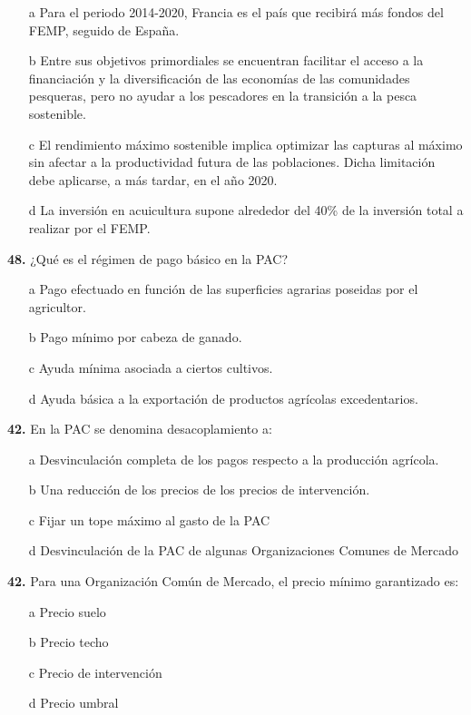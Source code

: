 \documentclass{nuevotema}
\begin{document}
\begin{enumerate}
    \item[a] Para el periodo 2014-2020, Francia es el país que recibirá más fondos del FEMP, seguido de España.
    \item[b] Entre sus objetivos primordiales se encuentran facilitar el acceso a la financiación y la diversificación de las economías de las comunidades pesqueras, pero no ayudar a los pescadores en la transición a la pesca sostenible.
    \item[c] El rendimiento máximo sostenible implica optimizar las capturas al máximo sin afectar a la productividad futura de las poblaciones. Dicha limitación debe aplicarse, a más tardar, en el año 2020.
    \item[d] La inversión en acuicultura supone alrededor del 40\% de la inversión total a realizar por el FEMP.
\end{enumerate}

\textbf{48.} ¿Qué es el régimen de pago básico en la PAC?
\begin{enumerate}
    \item[a] Pago efectuado en función de las superficies agrarias poseidas por el agricultor.
    \item[b] Pago mínimo por cabeza de ganado.
    \item[c] Ayuda mínima asociada a ciertos cultivos.
    \item[d] Ayuda básica a la exportación de productos agrícolas excedentarios.
\end{enumerate}

\textbf{42.} En la PAC se denomina desacoplamiento a:
\begin{itemize}
    \item[a] Desvinculación completa de los pagos respecto a la producción agrícola.
    \item[b] Una reducción de los precios de los precios de intervención.
    \item[c] Fijar un tope máximo al gasto de la PAC
    \item[d] Desvinculación de la PAC de algunas Organizaciones Comunes de Mercado
\end{itemize}

\textbf{42.} Para una Organización Común de Mercado, el precio mínimo garantizado es:
\begin{itemize}
    \item[a] Precio suelo
    \item[b] Precio techo
    \item[c] Precio de intervención
    \item[d] Precio umbral
\end{itemize}
\end{document}

